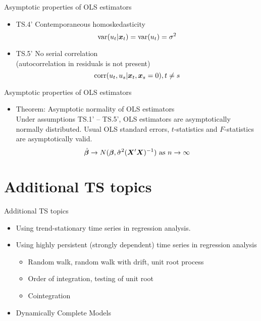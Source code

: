 \documentclass{beamer}
\begin{document}

\begin{frame}{Asymptotic properties of OLS estimators}
\begin{itemize}
\item TS.4' Contemporaneous homoskedasticity
$$\textnormal{var}(u_t|\boldsymbol{x}_t)=\textnormal{var}(u_t)=\sigma^2$$

\vspace{0.5cm}

\item TS.5' No serial correlation \\(autocorrelation in residuals is not present)
$$\textnormal{corr}(u_t,u_s|\boldsymbol{x}_t,\boldsymbol{x}_s=0), t\neq s$$
\end{itemize}
\end{frame}


\begin{frame}{Asymptotic properties of OLS estimators}
\begin{itemize}
\item Theorem: Asymptotic normality of OLS estimators \\
\vspace{0.5cm}
Under assumptions TS.1' – TS.5', OLS estimators are asymptotically normally distributed. Usual OLS standard errors, $t$-statistics and $F$-statistics are asymptotically valid.
$$
\hat{\bm{\beta}} \rightarrow N(\bm{\beta}, \hat{\sigma}^2(\bm{X}^{\prime} \bm{X})^{-1} )
\textnormal{~as~} n \rightarrow \infty
$$
\end{itemize}
\end{frame}


\section{Additional TS topics}
\begin{frame}{Additional TS topics}
\begin{itemize}
\item Using trend-stationary time series in regression analysis.

\vspace{0.5cm}

\item Using highly persistent (strongly dependent) time series in regression analysis
\begin{itemize}
\item Random walk, random walk with drift, unit root
process
\item Order of integration, testing of unit root
\item Cointegration
\end{itemize}

\vspace{0.5cm}

\item Dynamically Complete Models
\end{itemize}
\end{frame}
\end{document}
